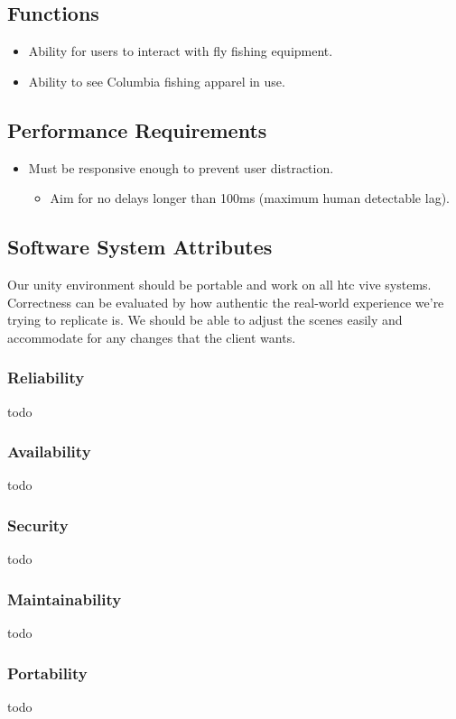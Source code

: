 \documentclass[10pt, oneside,onecolumn,draftclsnofoot]{IEEEtran}
\begin{document}
\subsection{Functions}
\begin{itemize}
  \item Ability for users to interact with fly fishing equipment.
  \item Ability to see Columbia fishing apparel in use.
\end{itemize}

\subsection{Performance Requirements}
\begin{itemize}
  \item Must be responsive enough to prevent user distraction.
  \begin{itemize}
    \item Aim for no delays longer than 100ms (maximum human detectable lag).
  \end{itemize}
\end{itemize}

\subsection{Software System Attributes}
Our unity environment should be portable and work on all htc vive systems.
Correctness can be evaluated by how authentic the real-world experience we're
trying to replicate is. We should be able to adjust the scenes easily and
accommodate for any changes that the client wants.

\subsubsection{Reliability}
todo
\subsubsection{Availability}
todo
\subsubsection{Security}
todo
\subsubsection{Maintainability}
todo
\subsubsection{Portability}
todo
\end{document}
